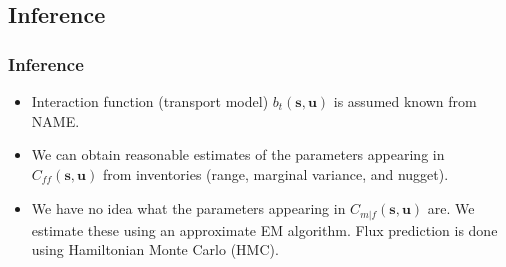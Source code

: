 \documentclass{beamer}
\newcommand{\svec} {\textbf{s}}
\newcommand{\uvec} {\textbf{u}}
\newcommand{\ff} {\textit{ff}}
\begin{document}
\subsection{Inference}

\begin{frame}
\frametitle{Inference}

\begin{itemize}
\item Interaction function (transport model) $b_t(\svec,\uvec)$ is assumed known from NAME. \vfill
\item We can obtain reasonable estimates of the parameters appearing in $C_{\ff}(\svec,\uvec)$ from inventories (range, marginal variance, and nugget). \vfill
\item We have no idea what the parameters appearing in $C_{m|f}(\svec,\uvec)$ are. We estimate these using an approximate EM algorithm. Flux prediction is done using Hamiltonian Monte Carlo (HMC).  \vfill
\end{itemize}
\end{frame}




\end{document}
